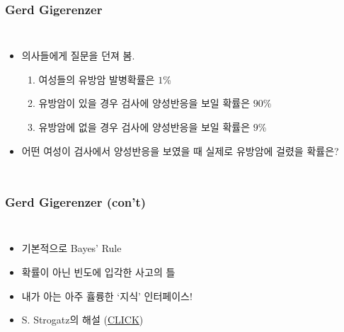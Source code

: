 \documentclass[final]{beamer}
\begin{document}
\begin{frame}\frametitle{Gerd Gigerenzer}\vspace{2em}
\begin{columns}[c]
\column{17em}
\begin{itemize}
	\item 의사들에게 질문을 던져 봄. 
	\begin{enumerate}
		\item 여성들의 유방암 발병확률은 $1${\%}
		\item 유방암이 있을 경우 검사에 양성반응을 보일 확률은 $90${\%}
		\item 유방암에 없을 경우 검사에 양성반응을 보일 확률은 $9${\%}
	\end{enumerate}
	\item 어떤 여성이 검사에서 양성반응을 보였을 때 실제로 유방암에 걸렸을 확률은? 
\end{itemize}
\column{13em}
\hspace{0em}
\end{columns}
\end{frame}
%
\begin{frame}\frametitle{Gerd Gigerenzer (con't)}\vspace{1.5em}
\begin{columns}[c]
\column{13em}
\begin{itemize}
	\item 기본적으로 Bayes' Rule
	\item 확률이 아닌 빈도에 입각한 사고의 틀 
    \item 내가 아는 아주 휼륭한 `지식' 인터페이스!
    \item S. Strogatz의 해설 (\href{http://opinionator.blogs.nytimes.com/2010/04/25/chances-are/}{CLICK})
\end{itemize}
\column{17em}
\hspace{-0.5em}
\end{columns}
\end{frame}

\end{document}
